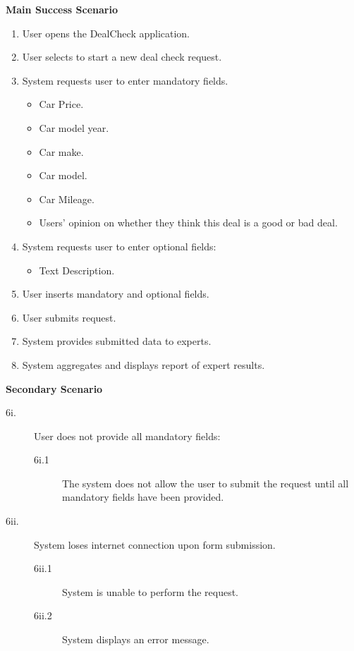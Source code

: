 \documentclass[]{article}
\begin{document}
\begin{enumerate}
\begin{enumerate}[{\bf {BE}1.}]
    {\bf Main Success Scenario}
        \begin{enumerate}[1.]
            \item User opens the DealCheck application.
            \item User selects to start a new deal check request.
            \item System requests user to enter mandatory fields.
            \begin{itemize}
                \item Car Price.
                \item Car model year.
                \item Car make.
                \item Car model.
                \item Car Mileage.
                \item Users' opinion on whether they think this deal is a good or bad deal.
            \end{itemize}
            \item System requests user to enter optional fields:
            \begin{itemize}
                \item Text Description.
            \end{itemize}
            \item User inserts mandatory and optional fields.
            \item User submits request.
            \item System provides submitted data to experts.
            \item System aggregates and displays report of expert results.
        \end{enumerate}
        
        {\bf Secondary Scenario} \\
        \begin{description}
			\item [6i.] User does not provide all mandatory fields:
			\begin{description}
				\item [6i.1] The system does not allow the user to submit the request until all mandatory fields have been provided.
			\end{description}
		
			\item [6ii.] System loses internet connection upon form submission.
			\begin{description}
				\item [6ii.1] System is unable to perform the request.
				\item [6ii.2] System displays an error message.
			\end{description}
		

\end{description}
\end{enumerate}
\end{enumerate}
\end{document}
